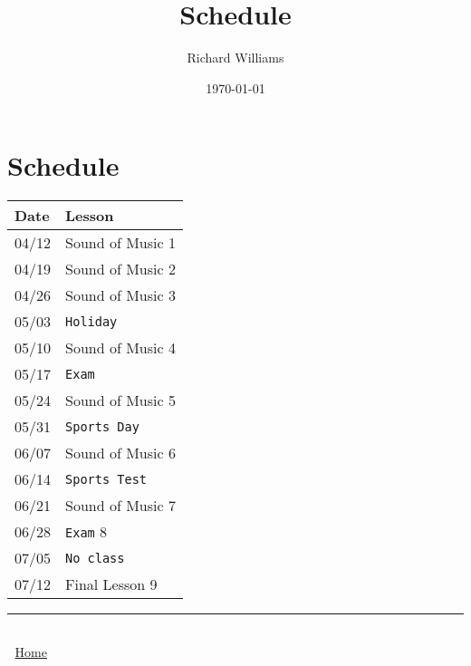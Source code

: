 \documentclass[11pt]{article}
\author{Richard Williams}
\date{\today}
\title{Schedule}
\begin{document}
\maketitle
\section*{Schedule}
\label{sec:org82df838}

\begin{center}
\begin{tabular}{ll}
\textbf{Date} & \textbf{Lesson}\\
\hline
04/12 & Sound of Music 1\\
04/19 & Sound of Music 2\\
04/26 & Sound of Music 3\\
05/03 & \texttt{Holiday}\\
05/10 & Sound of Music 4\\
05/17 & \texttt{Exam}\\
05/24 & Sound of Music 5\\
05/31 & \texttt{Sports Day}\\
06/07 & Sound of Music 6\\
06/14 & \texttt{Sports Test}\\
06/21 & Sound of Music 7\\
06/28 & \texttt{Exam} 8\\
07/05 & \texttt{No class}\\
07/12 & Final Lesson 9\\
\end{tabular}
\end{center}

\noindent\rule{\textwidth}{0.5pt}
\begin{HTML}
\begin{center}
\begin{tabular}{}
\\
\end{tabular}
\end{center}
🔗 \href{https://sendagirich.github.io/asuka/vl\_index.html}{Home}
\end{HTML}
\end{document}

